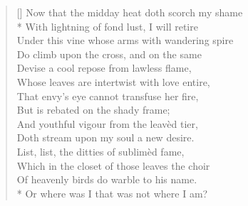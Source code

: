 \documentclass[MAIN]{subfiles}
\begin{document}
\settowidth{\versewidth}{Where all the women from the farm \& town}
\begin{verse}[\versewidth]
Now that the midday heat doth scorch my shame\\*
With lightning of fond lust, I will retire\\
Under this vine whose arms with wandering spire\\
Do climb upon the cross, and on the same\\
Devise a cool repose from lawless flame,\\
Whose leaves are intertwist with love entire,\\
That envy's eye cannot transfuse her fire,\\
But is rebated on the shady frame;\\
And youthful vigour from the leav\`ed tier,\\
Doth stream upon my soul a new desire.\\
List, list, the ditties of sublim\`ed fame,\\
Which in the closet of those leaves the choir\\
Of heavenly birds do warble to his name.\\*
Or where was I that was not where I am?
\end{verse}
\end{document}
